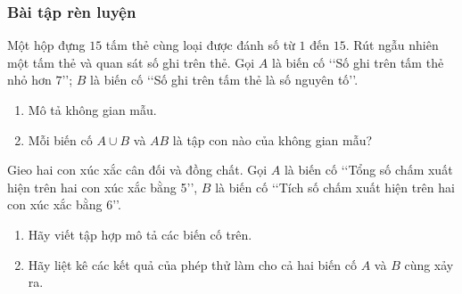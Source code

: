 \subsubsection{Bài tập rèn luyện}
\begin{bt}%
	Một hộp đựng $15$ tấm thẻ cùng loại được đánh số từ $1$ đến $15$. Rút ngẫu nhiên một tấm thẻ và quan sát số ghi trên thẻ. Gọi $A$ là biến cố \lq\lq  Số ghi trên tấm thẻ nhỏ hơn $7$\rq\rq; $B$ là biến cố \lq\lq  Số ghi trên tấm thẻ là số nguyên tố\rq\rq.
	\begin{enumerate}
		\item Mô tả không gian mẫu.
		\item Mỗi biến cố $A \cup B$ và $A B$ là tập con nào của không gian mẫu?
	\end{enumerate}
\end{bt}
\begin{bt}%
	Gieo hai con xúc xắc cân đối và đồng chất. Gọi $A$ là biến cố \lq\lq  Tổng số chấm xuất hiện trên hai con xúc xắc bằng 5\rq\rq, $B$ là biến cố \lq\lq  Tích số chấm xuất hiện trên hai con xúc xắc bằng 6\rq\rq.
	\begin{enumerate}
		\item Hãy viết tập hợp mô tả các biến cố trên.
		\item Hãy liệt kê các kết quả của phép thử làm cho cả hai biến cố $A$ và $B$ cùng xảy ra.
	\end{enumerate}
\end{bt}
